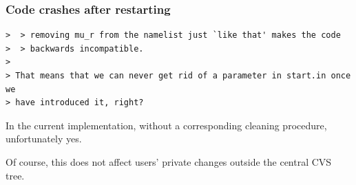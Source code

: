 \documentclass[\mydriver,12pt,twoside,notitlepage,a4paper]{article}
\begin{document}
\subsubsection{Code crashes after restarting}

\begin{Verbatim}
>  > removing mu_r from the namelist just `like that' makes the code
>  > backwards incompatible.
>
> That means that we can never get rid of a parameter in start.in once we
> have introduced it, right?
\end{Verbatim}

\medskip

{\em

  In the current implementation, without a corresponding cleaning procedure,
  unfortunately yes.

  Of course, this does not affect users' private changes outside the
  central CVS tree.






}
\end{document}
